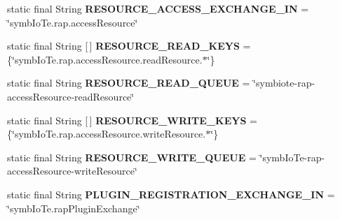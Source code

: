\begin{DoxyCompactItemize}
\item 
\mbox{\label{classeu_1_1h2020_1_1symbiote_1_1resources_1_1RapDefinitions_a2703c9e458cd3af663cc0a591c75a6cf}} 
static final String {\bfseries R\+E\+S\+O\+U\+R\+C\+E\+\_\+\+A\+C\+C\+E\+S\+S\+\_\+\+E\+X\+C\+H\+A\+N\+G\+E\+\_\+\+IN} = \char`\"{}symb\+Io\+Te.\+rap.\+access\+Resource\char`\"{}
\item 
\mbox{\label{classeu_1_1h2020_1_1symbiote_1_1resources_1_1RapDefinitions_a14b9cc087623e5befe7bf7275e444420}} 
static final String \mbox{[}$\,$\mbox{]} {\bfseries R\+E\+S\+O\+U\+R\+C\+E\+\_\+\+R\+E\+A\+D\+\_\+\+K\+E\+YS} = \{\char`\"{}symb\+Io\+Te.\+rap.\+access\+Resource.\+read\+Resource.$\ast$\char`\"{}\}
\item 
\mbox{\label{classeu_1_1h2020_1_1symbiote_1_1resources_1_1RapDefinitions_a6a565ef195ef87030e8ff81dab25acb4}} 
static final String {\bfseries R\+E\+S\+O\+U\+R\+C\+E\+\_\+\+R\+E\+A\+D\+\_\+\+Q\+U\+E\+UE} = \char`\"{}symbiote-\/rap-\/access\+Resource-\/read\+Resource\char`\"{}
\item 
\mbox{\label{classeu_1_1h2020_1_1symbiote_1_1resources_1_1RapDefinitions_aa549ad8832e93e57fe98680f6f3ffdaf}} 
static final String \mbox{[}$\,$\mbox{]} {\bfseries R\+E\+S\+O\+U\+R\+C\+E\+\_\+\+W\+R\+I\+T\+E\+\_\+\+K\+E\+YS} = \{\char`\"{}symb\+Io\+Te.\+rap.\+access\+Resource.\+write\+Resource.$\ast$\char`\"{}\}
\item 
\mbox{\label{classeu_1_1h2020_1_1symbiote_1_1resources_1_1RapDefinitions_af0df27f02e0313087cf81f1fe2f5d32c}} 
static final String {\bfseries R\+E\+S\+O\+U\+R\+C\+E\+\_\+\+W\+R\+I\+T\+E\+\_\+\+Q\+U\+E\+UE} = \char`\"{}symb\+Io\+Te-\/rap-\/access\+Resource-\/write\+Resource\char`\"{}
\item 
\mbox{\label{classeu_1_1h2020_1_1symbiote_1_1resources_1_1RapDefinitions_ac961c7e7d71ee7cf7c733226c582d4f1}} 
static final String {\bfseries P\+L\+U\+G\+I\+N\+\_\+\+R\+E\+G\+I\+S\+T\+R\+A\+T\+I\+O\+N\+\_\+\+E\+X\+C\+H\+A\+N\+G\+E\+\_\+\+IN} = \char`\"{}symb\+Io\+Te.\+rap\+Plugin\+Exchange\char`\"{}

\end{DoxyCompactItemize}
